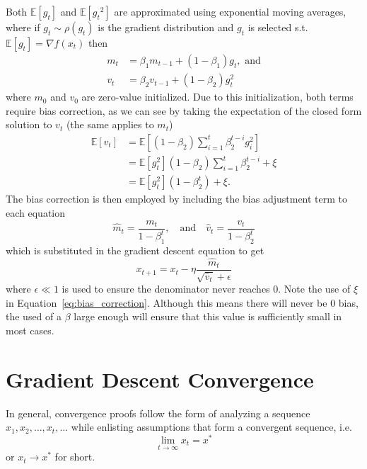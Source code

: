 \documentclass{article}
\newcommand{\E}{\mathbb E}
\theoremstyle{definition}
\begin{document}
Both $\E \left[ g_t \right]$ and $\E \left[ {g_t}^2
\right]$ are approximated using exponential moving averages, where if $g_t \sim
\rho(g_t)$ is the gradient distribution and $g_t$ is selected s.t. $\E[g_t] =
\nabla f(x_t)$ then
\begin{equation}
    \begin{aligned}
        m_t &= \beta_1 m_{t-1} + (1 - \beta_1)g_{t}, \text{ and} \\
        v_t &= \beta_2 v_{t-1} + (1 - \beta_2)g_{t}^2
    \end{aligned}
\end{equation}
where $m_0$ and $v_0$ are zero-value initialized. Due to this initialization,
both terms require bias correction, as we can see by taking the expectation of
the closed form solution to $v_t$ (the same applies to $m_t$)
\begin{equation}
    \label{eq:bias_correction}
    \begin{aligned}
        \E \left[ v_t \right] &= \E \left[ (1 - \beta_2) \sum_{i = 1}^t
        \beta_2^{t - i} g_i^2 \right] \\
         &= \E \left[g_t^2 \right](1 - \beta_2) \sum_{i = 1}^t
        \beta_2^{t - i} + \xi \\
         &= \E \left[g_t^2 \right](1 - \beta_2^t) + \xi.
    \end{aligned}
\end{equation}
The bias correction is then employed by including the bias adjustment term to
each equation
\begin{equation}
    \hat m_t = \frac{m_t}{1 - \beta_1^t}, \quad \text{and} \quad
    \hat v_t = \frac{v_t}{1 - \beta_2^t}
\end{equation}
which is substituted in the gradient descent equation to get 
\begin{equation}
    x_{t + 1} = x_t - \eta \frac{\hat m_t}{\sqrt{\hat v_t} + \epsilon}
\end{equation}
where $\epsilon \ll 1$ is used to ensure the denominator never reaches 0. Note
the use of $\xi$ in Equation~\ref{eq:bias_correction}. Although this means there
will never be 0 bias, the used of a $\beta$ large enough will ensure that this
value is sufficiently small in most cases.

\section{Gradient Descent Convergence}

In general, convergence proofs follow the form of analyzing a sequence $x_1,
x_2, \dots, x_t, \dots$ while enlisting assumptions that form a convergent
sequence, i.e.
\begin{equation}
    \lim_{t \rightarrow \infty} x_t = x^* 
\end{equation} or $x_t \rightarrow x^*$ for short.
\end{document}
